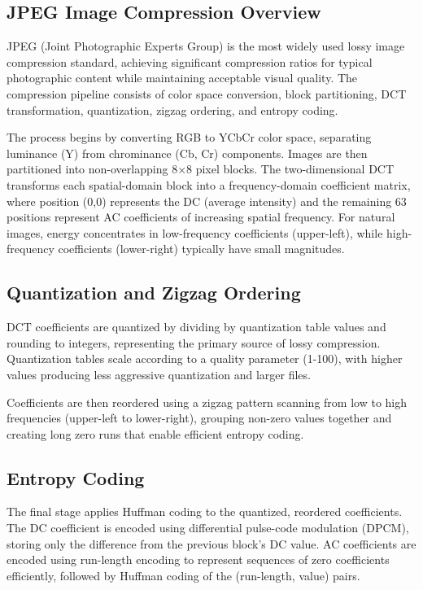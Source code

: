 \documentclass{article}
\begin{document}
\subsection{JPEG Image Compression Overview}

JPEG (Joint Photographic Experts Group) is the most widely used lossy image compression standard, achieving significant compression ratios for typical photographic content while maintaining acceptable visual quality. The compression pipeline consists of color space conversion, block partitioning, DCT transformation, quantization, zigzag ordering, and entropy coding.

The process begins by converting RGB to YCbCr color space, separating luminance (Y) from chrominance (Cb, Cr) components. Images are then partitioned into non-overlapping 8×8 pixel blocks. The two-dimensional DCT transforms each spatial-domain block into a frequency-domain coefficient matrix, where position (0,0) represents the DC (average intensity) and the remaining 63 positions represent AC coefficients of increasing spatial frequency. For natural images, energy concentrates in low-frequency coefficients (upper-left), while high-frequency coefficients (lower-right) typically have small magnitudes.

\subsection{Quantization and Zigzag Ordering}

DCT coefficients are quantized by dividing by quantization table values and rounding to integers, representing the primary source of lossy compression. Quantization tables scale according to a quality parameter (1-100), with higher values producing less aggressive quantization and larger files.

Coefficients are then reordered using a zigzag pattern scanning from low to high frequencies (upper-left to lower-right), grouping non-zero values together and creating long zero runs that enable efficient entropy coding.

\subsection{Entropy Coding}

The final stage applies Huffman coding to the quantized, reordered coefficients. The DC coefficient is encoded using differential pulse-code modulation (DPCM), storing only the difference from the previous block's DC value. AC coefficients are encoded using run-length encoding to represent sequences of zero coefficients efficiently, followed by Huffman coding of the (run-length, value) pairs.
\end{document}
